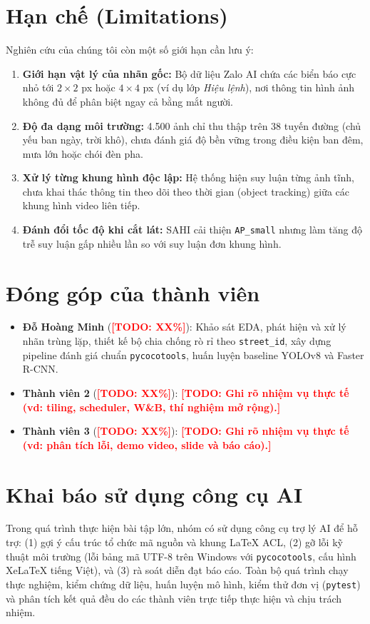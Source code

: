 \documentclass[11pt]{article}
\newcommand{\todo}[1]{\textcolor{red}{\textbf{[TODO: #1]}}}
\begin{document}
\section*{Hạn chế (Limitations)}
Nghiên cứu của chúng tôi còn một số giới hạn cần lưu ý:
\begin{enumerate}
  \item \textbf{Giới hạn vật lý của nhãn gốc:} Bộ dữ liệu Zalo AI chứa các biển báo cực nhỏ tới $2\times 2$ px hoặc $4\times 4$ px (ví dụ lớp \textit{Hiệu lệnh}), nơi thông tin hình ảnh không đủ để phân biệt ngay cả bằng mắt người.
  \item \textbf{Độ đa dạng môi trường:} 4.500 ảnh chỉ thu thập trên 38 tuyến đường (chủ yếu ban ngày, trời khô), chưa đánh giá độ bền vững trong điều kiện ban đêm, mưa lớn hoặc chói đèn pha.
  \item \textbf{Xử lý từng khung hình độc lập:} Hệ thống hiện suy luận từng ảnh tĩnh, chưa khai thác thông tin theo dõi theo thời gian (object tracking) giữa các khung hình video liên tiếp.
  \item \textbf{Đánh đổi tốc độ khi cắt lát:} SAHI cải thiện \texttt{AP\_small} nhưng làm tăng độ trễ suy luận gấp nhiều lần so với suy luận đơn khung hình.
\end{enumerate}

\section*{Đóng góp của thành viên}
\begin{itemize}
  \item \textbf{Đỗ Hoàng Minh} (\todo{XX\%}): Khảo sát EDA, phát hiện và xử lý nhãn trùng lặp, thiết kế bộ chia chống rò rỉ theo \texttt{street\_id}, xây dựng pipeline đánh giá chuẩn \texttt{pycocotools}, huấn luyện baseline YOLOv8 và Faster R-CNN.
  \item \textbf{Thành viên 2} (\todo{XX\%}): \todo{Ghi rõ nhiệm vụ thực tế (vd: tiling, scheduler, W\&B, thí nghiệm mở rộng).}
  \item \textbf{Thành viên 3} (\todo{XX\%}): \todo{Ghi rõ nhiệm vụ thực tế (vd: phân tích lỗi, demo video, slide và báo cáo).}
\end{itemize}

\section*{Khai báo sử dụng công cụ AI}
Trong quá trình thực hiện bài tập lớn, nhóm có sử dụng công cụ trợ lý AI để hỗ trợ: (1) gợi ý cấu trúc tổ chức mã nguồn và khung LaTeX ACL, (2) gỡ lỗi kỹ thuật môi trường (lỗi bảng mã UTF-8 trên Windows với \texttt{pycocotools}, cấu hình XeLaTeX tiếng Việt), và (3) rà soát diễn đạt báo cáo. Toàn bộ quá trình chạy thực nghiệm, kiểm chứng dữ liệu, huấn luyện mô hình, kiểm thử đơn vị (\texttt{pytest}) và phân tích kết quả đều do các thành viên trực tiếp thực hiện và chịu trách nhiệm.
\end{document}
